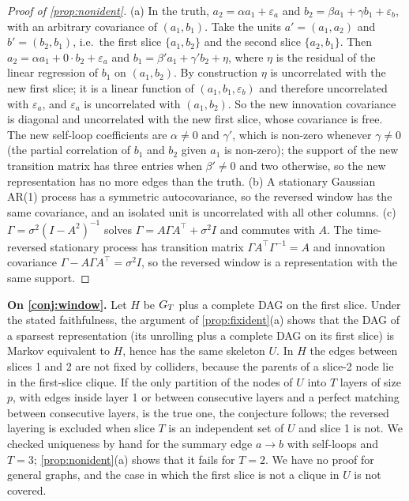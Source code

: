 \begin{proof}[Proof of \cref{prop:nonident}]
(a) In the truth, $a_2=\alpha a_1+\varepsilon_a$ and
$b_2=\beta a_1+\gamma b_1+\varepsilon_b$, with an arbitrary covariance of
$(a_1,b_1)$. Take the units $a'=(a_1,a_2)$ and $b'=(b_2,b_1)$, i.e.\ the first
slice $\{a_1,b_2\}$ and the second slice $\{a_2,b_1\}$. Then
$a_2=\alpha a_1+0\cdot b_2+\varepsilon_a$ and $b_1=\beta'a_1+\gamma'b_2+\eta$,
where $\eta$ is the residual of the linear regression of $b_1$ on
$(a_1,b_2)$. By construction $\eta$ is uncorrelated with the new first slice;
it is a linear function of $(a_1,b_1,\varepsilon_b)$ and therefore
uncorrelated with $\varepsilon_a$, and $\varepsilon_a$ is uncorrelated with
$(a_1,b_2)$. So the new innovation covariance is diagonal and uncorrelated
with the new first slice, whose covariance is free. The new self-loop
coefficients are $\alpha\ne0$ and $\gamma'$, which is non-zero whenever
$\gamma\ne0$ (the partial correlation of $b_1$ and $b_2$ given $a_1$ is
non-zero); the support of the new transition matrix has three entries when
$\beta'\ne0$ and two otherwise, so the new representation has no more edges
than the truth.
(b) A stationary Gaussian AR(1) process has a symmetric autocovariance, so
the reversed window has the same covariance, and an isolated unit is
uncorrelated with all other columns.
(c) $\Gamma=\sigma^2(I-A^2)^{-1}$ solves $\Gamma=A\Gamma A^\top+\sigma^2I$ and
commutes with $A$. The time-reversed stationary process has transition matrix
$\Gamma A^\top\Gamma^{-1}=A$ and innovation covariance
$\Gamma-A\Gamma A^\top=\sigma^2I$, so the reversed window is a representation
with the same support.
\end{proof}

\textbf{On \cref{conj:window}.} Let $H$ be $G_T$ plus a complete DAG on the
first slice. Under the stated faithfulness, the argument of
\cref{prop:fixident}(a) shows that the DAG of a sparsest representation (its
unrolling plus a complete DAG on its first slice) is Markov equivalent to $H$,
hence has the same skeleton $U$. In $H$ the edges between slices 1 and 2 are
not fixed by colliders, because the parents of a slice-2 node lie in the
first-slice clique. If the only partition of the nodes of $U$ into $T$ layers
of size $p$, with edges inside layer 1 or between consecutive layers and a
perfect matching between consecutive layers, is the true one, the conjecture
follows; the reversed layering is excluded when slice $T$ is an independent
set of $U$ and slice 1 is not. We checked uniqueness by hand for the summary
edge $a\to b$ with self-loops and $T=3$; \cref{prop:nonident}(a) shows that it
fails for $T=2$. We have no proof for general graphs, and the case in which
the first slice is not a clique in $U$ is not covered.
